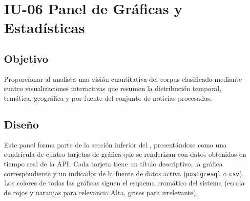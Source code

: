 \section{IU-06 Panel de Gráficas y Estadísticas}

\subsection{Objetivo}
	Proporcionar al analista una visión cuantitativa del corpus clasificado mediante cuatro
	visualizaciones interactivas que resumen la distribución temporal, temática, geográfica
	y por fuente del conjunto de noticias procesadas.

\subsection{Diseño}
	Este panel forma parte de la sección inferior del ,
	presentándose como una cuadrícula de cuatro tarjetas de gráfica que se renderizan con datos
	obtenidos en tiempo real de la API. Cada tarjeta tiene un título descriptivo, la gráfica
	correspondiente y un indicador de la fuente de datos activa (\texttt{postgresql} o
	\texttt{csv}). Los colores de todas las gráficas siguen el esquema cromático del sistema
	(escala de rojos y naranjas para relevancia Alta, grises para irrelevante).


